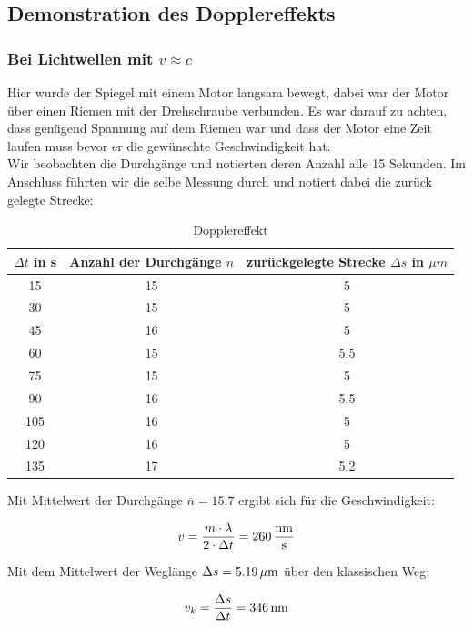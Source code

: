 \documentclass[a4paper,titlepage]{scrartcl}
\numberwithin{equation}{section}
\begin{document}
\subsection{Demonstration des Dopplereffekts}
\subsubsection{Bei Lichtwellen mit $v \approx c$}
Hier wurde der Spiegel mit einem Motor langsam bewegt, dabei war der Motor über einen Riemen mit der Drehschraube verbunden. Es war darauf zu achten, dass genügend Spannung auf dem Riemen war und dass der Motor eine Zeit laufen muss bevor er die gewünschte Geschwindigkeit hat.\\
Wir beobachten die Durchgänge und notierten deren Anzahl alle 15 Sekunden. Im Anschluss führten wir die selbe Messung durch und notiert dabei die zurück gelegte Strecke:
 
\begin{table}[H]
\centering
\caption{Dopplereffekt}
 \begin{tabular}{c|c|c}
   $\Delta t$ in s & Anzahl der Durchgänge $n$ & zurückgelegte Strecke $\Delta s$ in $\mu m$ \\
  \hline
  15 & 15 & 5\\
  30 & 15 & 5\\
  45 & 16 & 5\\
  60 & 15 & 5.5\\
  75 & 15 & 5\\
  90 & 16 & 5.5\\
  105 & 16 & 5\\
  120 & 16 & 5\\
  135 & 17 & 5.2\\   
 \end{tabular}
\end{table}
 
Mit Mittelwert der Durchgänge $\overline{n}=15.7$ ergibt sich für die Geschwindigkeit:
 
\begin{equation*}
v= \frac{m \cdot \lambda}{2 \cdot \Delta t} = \unit[260]{\frac{nm}{s}}
\end{equation*}
 
Mit dem Mittelwert der Weglänge $\Delta s = \unit[5.19]{\mu m}$ über den klassischen Weg:
 
\begin{equation*}
v_k= \frac{\Delta s}{\Delta t}= \unit[346]{nm}
\end{equation*}
 
\end{document}

